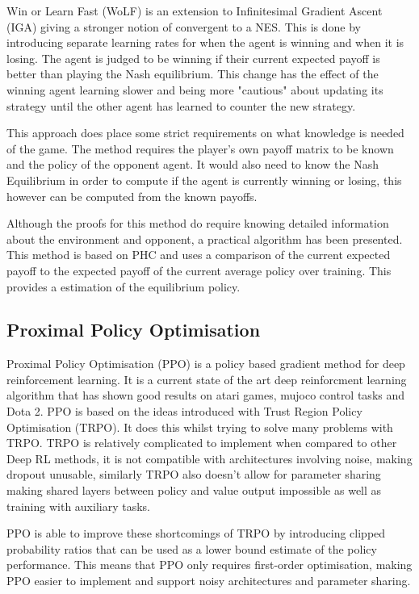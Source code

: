 \documentclass[conference]{IEEEtran}
\begin{document}
Win or Learn Fast (WoLF) is an extension to Infinitesimal Gradient Ascent (IGA)\cite{singh2000nash} giving a stronger notion of convergent to a NES. This is done by introducing separate learning rates for when the agent is winning and when it is losing. The agent is judged to be winning if their current expected payoff is better than playing the Nash equilibrium. This change has the effect of the winning agent learning slower and being more "cautious" about updating its strategy until the other agent has learned to counter the new strategy.

This approach does place some strict requirements on what knowledge is needed of the game. The method requires the player's own payoff matrix to be known and the policy of the opponent agent. It would also need to know the Nash Equilibrium in order to compute if the agent is currently winning or losing, this however can be computed from the known payoffs\cite{bowling2002multiagent}.

Although the proofs for this method do require knowing detailed information about the environment and opponent, a practical algorithm has been presented. This method is based on PHC and uses a comparison of the current expected payoff to the expected payoff of the current average policy over training. This provides a estimation of the equilibrium policy.

\subsection{Proximal Policy Optimisation}

Proximal Policy Optimisation (PPO) is a policy based gradient method for deep reinforcement learning. It is a current state of the art deep reinforcment learning algorithm that has shown good results on atari games, mujoco control tasks\cite{schulman2017proximal} and Dota 2\cite{OpenAI_dota}. PPO is based on the ideas introduced with Trust Region Policy Optimisation (TRPO)\cite{schulman2015trust}. It does this whilst trying to solve many problems with TRPO. TRPO is relatively complicated to implement when compared to other Deep RL methods, it is not compatible with architectures involving noise, making dropout unusable, similarly TRPO also doesn't allow for parameter sharing making shared layers between policy and value output impossible as well as training with auxiliary tasks.

PPO is able to improve these shortcomings of TRPO by introducing clipped probability ratios that can be used as a lower bound estimate of the policy performance. This means that PPO only requires first-order optimisation, making PPO easier to implement and support noisy architectures and parameter sharing. 
\end{document}
